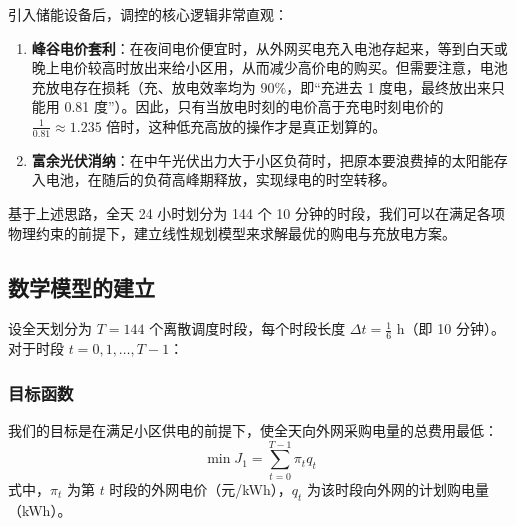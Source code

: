 \documentclass[withoutpreface]{cumcmthesis}
\begin{document}
引入储能设备后，调控的核心逻辑非常直观：
\begin{enumerate}
    \item \textbf{峰谷电价套利}：在夜间电价便宜时，从外网买电充入电池存起来，等到白天或晚上电价较高时放出来给小区用，从而减少高价电的购买。但需要注意，电池充放电存在损耗（充、放电效率均为 $90\%$，即“充进去 1 度电，最终放出来只能用 0.81 度”）。因此，只有当放电时刻的电价高于充电时刻电价的 $\frac{1}{0.81} \approx 1.235$ 倍时，这种低充高放的操作才是真正划算的。
    \item \textbf{富余光伏消纳}：在中午光伏出力大于小区负荷时，把原本要浪费掉的太阳能存入电池，在随后的负荷高峰期释放，实现绿电的时空转移。
\end{enumerate}
基于上述思路，全天 24 小时划分为 144 个 10 分钟的时段，我们可以在满足各项物理约束的前提下，建立线性规划模型来求解最优的购电与充放电方案。

\subsection{数学模型的建立}
设全天划分为 $T = 144$ 个离散调度时段，每个时段长度 $\Delta t = \frac{1}{6}\text{ h}$（即 10 分钟）。对于时段 $t = 0, 1, \dots, T-1$：

\subsubsection{目标函数}
我们的目标是在满足小区供电的前提下，使全天向外网采购电量的总费用最低：
\begin{equation}
    \min J_1 = \sum_{t=0}^{T-1} \pi_t q_t \label{eq:q1_obj}
\end{equation}
式中，$\pi_t$ 为第 $t$ 时段的外网电价（元/kWh），$q_t$ 为该时段向外网的计划购电量（kWh）。
\end{document}
